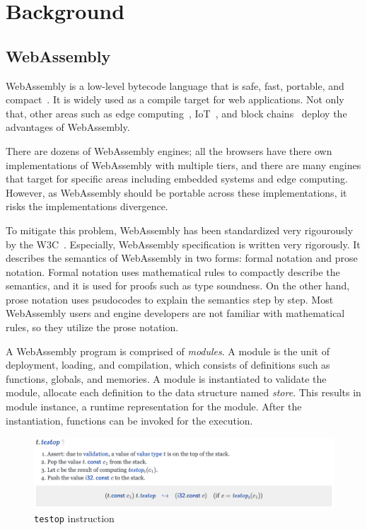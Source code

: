 
\chapter{Background}
\label{ch:background}
\noindent


\section{WebAssembly}

WebAssembly is a low-level bytecode language that is safe, fast, portable, and
compact~\cite{wasm}.
It is widely used as a compile target for web applications.
Not only that, other areas such as edge computing~\cite{wasm-edge},
IoT~\cite{wasm-iot}, and block chains~\cite{wasm-block} deploy the advantages
of WebAssembly.

There are dozens of WebAssembly engines; all the browsers have there own
implementations of WebAssembly with multiple tiers, and there are many engines
that target for specific areas including embedded systems and edge computing.
However, as WebAssembly should be portable across these implementations, it risks
the implementations divergence.

To mitigate this problem, WebAssembly has been standardized very rigourously by
the W3C~\cite{wasm-w3c}.
Especially, WebAssembly specification is written very rigorously.
It describes the semantics of WebAssembly in two forms: formal notation and
prose notation.
Formal notation uses mathematical rules to compactly describe the semantics,
and it is used for proofs such as type soundness.
On the other hand, prose notation uses psudocodes to explain the semantics step
by step.
Most WebAssembly users and engine developers are not familiar with
mathematical rules, so they utilize the prose notation.

A WebAssembly program is comprised of \textit{modules}.
A module is the unit of deployment, loading, and compilation, which consists of
definitions such as functions, globals, and memories.
A module is instantiated to validate the module, allocate each definition to
the data structure named \textit{store}.
This results in module instance, a runtime representation for the module.
After the instantiation, functions can be invoked for the execution.

\begin{figure}[t]
    \centerline{\includegraphics[width=15cm]{fig/testop}}
    \caption[Enter the caption title here]{\texttt{testop} instruction} \label{fig:testop}
\end{figure}

